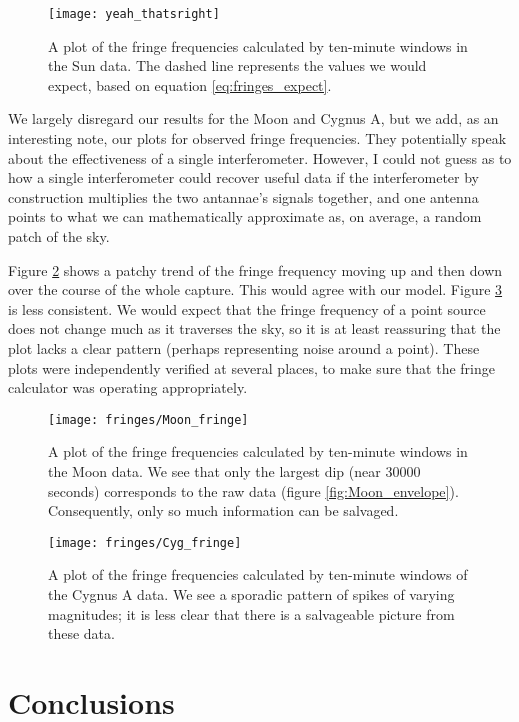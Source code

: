 \documentclass[12pt]{article}
\begin{document}
\begin{figure}
	\centering
	\texttt{[image: yeah\_thatsright]}
	\caption{A plot of the fringe frequencies calculated by ten-minute windows in the Sun data. The dashed line represents the values we would expect, based on equation \ref{eq:fringes_expect}.}
	\label{fig:Sun_fringes}
\end{figure}

We largely disregard our results for the Moon and Cygnus A, but we add, as an interesting note, our plots for observed fringe frequencies. They potentially speak about the effectiveness of a single interferometer. However, I could not guess as to how a single interferometer could recover useful data if the interferometer by construction multiplies the two antannae's signals together, and one antenna points to what we can mathematically approximate as, on average, a random patch of the sky. 

Figure \ref{fig:Moon_fringes} shows a patchy trend of the fringe frequency moving up and then down over the course of the whole capture. This would agree with our model. Figure \ref{fig:CygA_fringes} is less consistent. We would expect that the fringe frequency of a point source does not change much as it traverses the sky, so it is at least reassuring that the plot lacks a clear pattern (perhaps representing noise around a point). These plots were independently verified at several places, to make sure that the fringe calculator was operating appropriately.

\begin{figure}
	\centering
	\texttt{[image: fringes/Moon\_fringe]}
	\caption{A plot of the fringe frequencies calculated by ten-minute windows in the Moon data. We see that only the largest dip (near 30000 seconds) corresponds to the raw data (figure \ref{fig:Moon_envelope}). Consequently, only so much information can be salvaged.}
	\label{fig:Moon_fringes}
\end{figure}

\begin{figure}
	\centering
	\texttt{[image: fringes/Cyg\_fringe]}
	\caption{A plot of the fringe frequencies calculated by ten-minute windows of the Cygnus A data. We see a sporadic pattern of spikes of varying magnitudes; it is less clear that there is a salvageable picture from these data.}
	\label{fig:CygA_fringes}
\end{figure}

\section{Conclusions}
\end{document}
